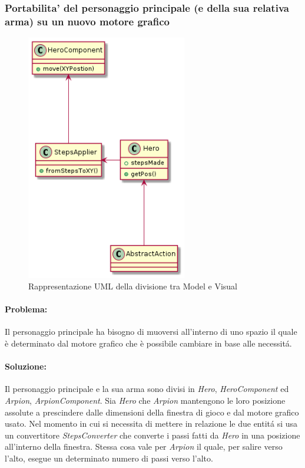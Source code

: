 \documentclass[a4paper,12pt]{report}
\begin{document}
\subsubsection{Portabilita' del personaggio principale (e della sua relativa arma) su un nuovo motore grafico}
\begin{figure}[H]
    \centering{}
    \includegraphics[width=7cm]{img/Actor.png}
    \caption{Rappresentazione UML della divisione tra Model e Visual}
    \end{figure}
    
\paragraph{Problema:}Il personaggio principale ha bisogno di muoversi all'interno di uno spazio il quale è determinato dal motore grafico che è possibile cambiare in base alle necessitá.

\paragraph{Soluzione:}Il personaggio principale e la sua arma sono divisi in \emph{Hero}, \emph{HeroComponent} ed \emph{Arpion}, \emph{ArpionComponent}. Sia \emph{Hero} che \emph{Arpion} mantengono le loro posizione assolute a prescindere dalle dimensioni della finestra di gioco e dal motore grafico usato.
Nel momento in cui si necessita di mettere in relazione le due entitá si usa un convertitore \emph{StepsConverter} che converte i passi fatti da \emph{Hero} in una posizione all'interno della finestra. Stessa cosa vale per \emph{Arpion} il quale, per salire verso l'alto, esegue un determinato numero di passi verso l'alto.
\end{document}
